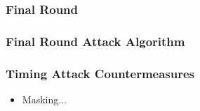 \documentclass[8pt,handout]{beamer}
\begin{document}
\begin{frame}
	\frametitle{Final Round}
\end{frame}

\begin{frame}
	\frametitle{Final Round Attack Algorithm}
\end{frame}

\begin{frame}
	\frametitle{Timing Attack Countermeasures}
	\begin{itemize}
		\item Masking...
	\end{itemize}
\end{frame}	

\end{document}
